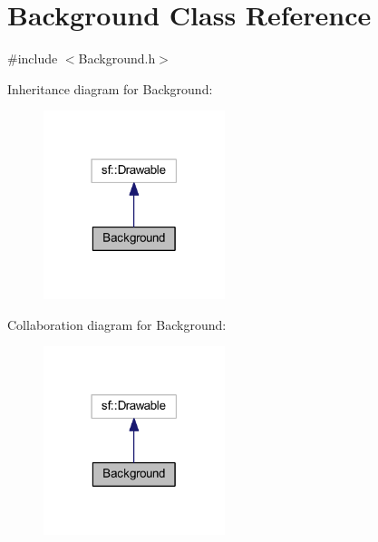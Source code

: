 \hypertarget{class_background}{}\section{Background Class Reference}
\label{class_background}


{\ttfamily \#include $<$Background.\+h$>$}



Inheritance diagram for Background\+:
\nopagebreak
\begin{figure}[H]
\begin{center}
\leavevmode
\includegraphics[width=150pt]{class_background__inherit__graph}
\end{center}
\end{figure}


Collaboration diagram for Background\+:
\nopagebreak
\begin{figure}[H]
\begin{center}
\leavevmode
\includegraphics[width=150pt]{class_background__coll__graph}
\end{center}
\end{figure}
